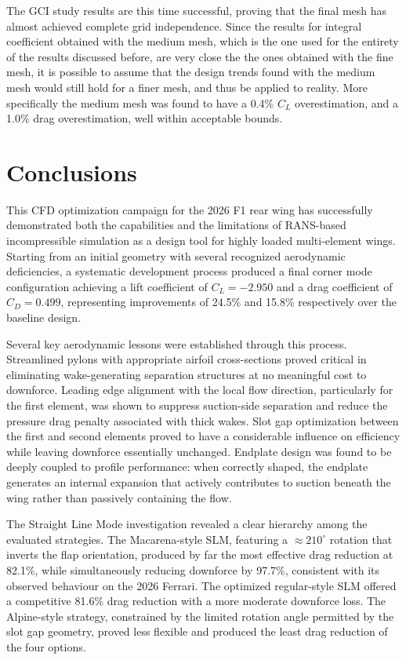 \documentclass[12pt,a4paper]{article}
\begin{document}
The GCI study results are this time successful, proving that the final mesh has almost achieved complete grid independence. Since the results for integral coefficient obtained with the medium mesh, which is the one used for the entirety of the results discussed before, are very close the the ones obtained with the fine mesh, it is possible to assume that the design trends found with the medium mesh would still hold for a finer mesh, and thus be applied to reality. More specifically the medium mesh was found to have a 0.4\% $C_L$ overestimation, and a 1.0\% drag overestimation, well within acceptable bounds.

\section{Conclusions}

This CFD optimization campaign for the 2026 F1 rear wing has successfully demonstrated both the capabilities and the limitations of RANS-based incompressible simulation as a design tool for highly loaded multi-element wings. Starting from an initial geometry with several recognized aerodynamic deficiencies, a systematic development process produced a final corner mode configuration achieving a lift coefficient of $C_L = -2.950$ and a drag 
coefficient of $C_D = 0.499$, representing improvements of 24.5\% and 15.8\% respectively over the baseline design.

Several key aerodynamic lessons were established through this process. Streamlined pylons with appropriate airfoil cross-sections proved critical in eliminating wake-generating separation structures at no meaningful cost to downforce. Leading edge alignment with the local flow direction, particularly for the first element, was shown to suppress suction-side separation and reduce the pressure drag penalty associated with thick wakes. Slot gap optimization between the first and second elements proved to have a considerable influence on efficiency while leaving downforce essentially unchanged. Endplate design was found to be deeply coupled to profile performance: when correctly shaped, the endplate generates an internal expansion that actively contributes to suction beneath the wing rather than passively containing the flow.

The Straight Line Mode investigation revealed a clear hierarchy among the evaluated strategies. The Macarena-style SLM, featuring a $\approx210^\circ$ rotation that inverts the flap orientation, produced by far the most effective drag reduction at 82.1\%, while simultaneously reducing downforce by 97.7\%, consistent with its observed behaviour on the 2026 Ferrari. The optimized regular-style SLM offered a competitive 81.6\% drag reduction with a more moderate downforce loss. The Alpine-style strategy, constrained by the limited rotation angle permitted by the slot gap geometry, proved less flexible and produced the least drag reduction of the four options.
\end{document}
